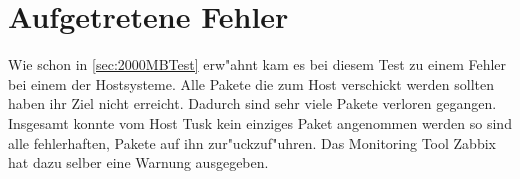 \section{Aufgetretene Fehler}
\label{sec:fehler}

Wie schon in \cref{sec:2000MBTest} erw"ahnt kam es bei diesem Test zu einem Fehler %
bei einem der Hostsysteme. Alle Pakete die zum Host verschickt werden sollten %
haben ihr Ziel nicht erreicht. Dadurch sind sehr viele Pakete verloren gegangen. %
Insgesamt konnte vom Host Tusk kein einziges Paket angenommen werden so sind alle %
fehlerhaften, Pakete auf ihn zur"uckzuf"uhren. Das Monitoring Tool Zabbix hat dazu selber %
eine Warnung ausgegeben.  
